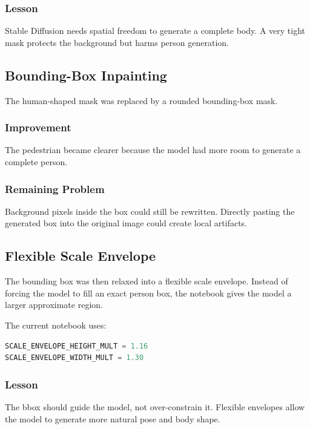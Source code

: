 \documentclass[12pt,a4paper]{article}
\begin{document}
\subsubsection{Lesson}

Stable Diffusion needs spatial freedom to generate a complete body. A very tight
mask protects the background but harms person generation.

\subsection{Bounding-Box Inpainting}

The human-shaped mask was replaced by a rounded bounding-box mask.

\subsubsection{Improvement}

The pedestrian became clearer because the model had more room to generate a
complete person.

\subsubsection{Remaining Problem}

Background pixels inside the box could still be rewritten. Directly pasting the
generated box into the original image could create local artifacts.

\subsection{Flexible Scale Envelope}

The bounding box was then relaxed into a flexible scale envelope. Instead of
forcing the model to fill an exact person box, the notebook gives the model a
larger approximate region.

The current notebook uses:

\begin{lstlisting}[language=Python,caption={Current scale envelope values}]
SCALE_ENVELOPE_HEIGHT_MULT = 1.16
SCALE_ENVELOPE_WIDTH_MULT = 1.30
\end{lstlisting}

\subsubsection{Lesson}

The bbox should guide the model, not over-constrain it. Flexible envelopes allow
the model to generate more natural pose and body shape.
\end{document}
